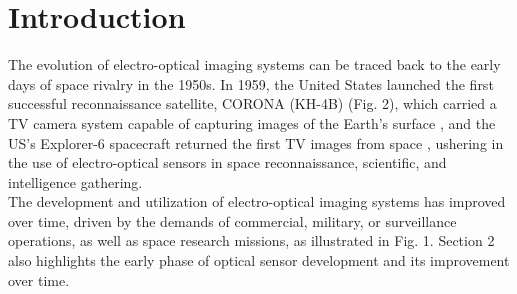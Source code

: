 \documentclass[final,5p,times,twocolumn,authoryear]{elsarticle}
\begin{document}
\section{Introduction}
\label{}
The evolution of electro-optical imaging systems can be traced back to the early days of space rivalry in the 1950s. In 1959, the United States launched the first successful reconnaissance satellite, CORONA (KH-4B) (Fig. 2), which carried a TV camera system capable of capturing images of the Earth's surface \citep{ruffner1995corona}, and the US's Explorer-6 spacecraft returned the first TV images from space \citep{christopherson20192019, judge1962observations}, ushering in the use of electro-optical sensors in space reconnaissance, scientific, and intelligence gathering.\\
The development and utilization of electro-optical imaging systems has improved over time, driven by the demands of commercial, military, or surveillance operations, as well as space research missions, as illustrated in Fig. 1. Section 2 also highlights the early phase of optical sensor development and its improvement over time.
\end{document}
